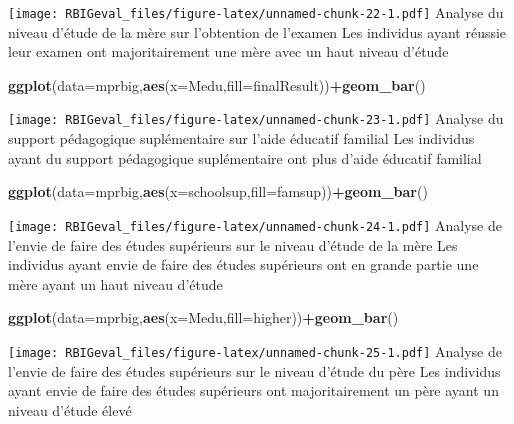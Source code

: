 \documentclass[
]{article}
\newenvironment{Shaded}{\begin{snugshade}}{\end{snugshade}}
\newcommand{\DataTypeTok}[1]{\textcolor[rgb]{0.13,0.29,0.53}{#1}}
\newcommand{\KeywordTok}[1]{\textcolor[rgb]{0.13,0.29,0.53}{\textbf{#1}}}
\newcommand{\NormalTok}[1]{#1}
\newcommand{\OperatorTok}[1]{\textcolor[rgb]{0.81,0.36,0.00}{\textbf{#1}}}
\begin{document}
\texttt{[image: RBIGeval\_files/figure-latex/unnamed-chunk-22-1.pdf]}
Analyse du niveau d'étude de la mère sur l'obtention de l'examen Les
individus ayant réussie leur examen ont majoritairement une mère avec un
haut niveau d'étude

\begin{Shaded}
\begin{Highlighting}[]
\KeywordTok{ggplot}\NormalTok{(}\DataTypeTok{data=}\NormalTok{mprbig,}\KeywordTok{aes}\NormalTok{(}\DataTypeTok{x=}\NormalTok{Medu,}\DataTypeTok{fill=}\NormalTok{finalResult))}\OperatorTok{+}\KeywordTok{geom_bar}\NormalTok{()}
\end{Highlighting}
\end{Shaded}

\texttt{[image: RBIGeval\_files/figure-latex/unnamed-chunk-23-1.pdf]}
Analyse du support pédagogique suplémentaire sur l'aide éducatif
familial Les individus ayant du support pédagogique suplémentaire ont
plus d'aide éducatif familial

\begin{Shaded}
\begin{Highlighting}[]
\KeywordTok{ggplot}\NormalTok{(}\DataTypeTok{data=}\NormalTok{mprbig,}\KeywordTok{aes}\NormalTok{(}\DataTypeTok{x=}\NormalTok{schoolsup,}\DataTypeTok{fill=}\NormalTok{famsup))}\OperatorTok{+}\KeywordTok{geom_bar}\NormalTok{()}
\end{Highlighting}
\end{Shaded}

\texttt{[image: RBIGeval\_files/figure-latex/unnamed-chunk-24-1.pdf]}
Analyse de l'envie de faire des études supérieurs sur le niveau d'étude
de la mère Les individus ayant envie de faire des études supérieurs ont
en grande partie une mère ayant un haut niveau d'étude

\begin{Shaded}
\begin{Highlighting}[]
\KeywordTok{ggplot}\NormalTok{(}\DataTypeTok{data=}\NormalTok{mprbig,}\KeywordTok{aes}\NormalTok{(}\DataTypeTok{x=}\NormalTok{Medu,}\DataTypeTok{fill=}\NormalTok{higher))}\OperatorTok{+}\KeywordTok{geom_bar}\NormalTok{()}
\end{Highlighting}
\end{Shaded}

\texttt{[image: RBIGeval\_files/figure-latex/unnamed-chunk-25-1.pdf]}
Analyse de l'envie de faire des études supérieurs sur le niveau d'étude
du père Les individus ayant envie de faire des études supérieurs ont
majoritairement un père ayant un niveau d'étude élevé
\end{document}
